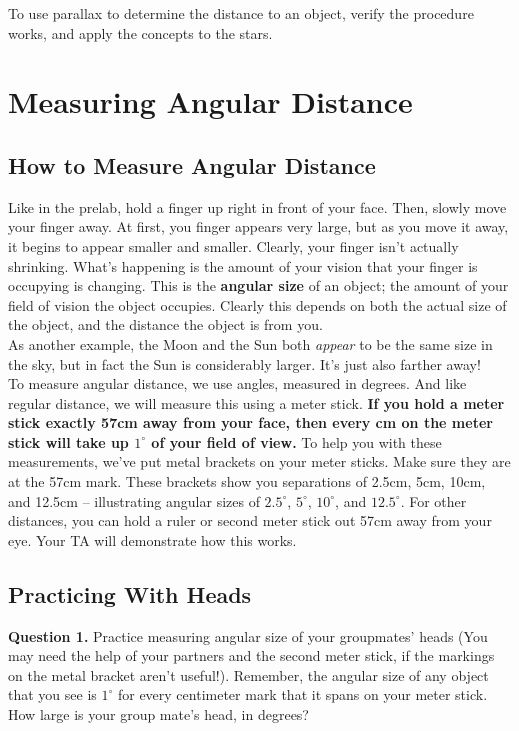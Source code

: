 \documentclass[11pt]{article}
\begin{document}
To use parallax to determine the distance to an object, verify the procedure works, and apply the concepts to the stars.

\newpage

\section{Measuring Angular Distance}

\subsection{How to Measure Angular Distance}
Like in the prelab, hold a finger up right in front of your face. Then, slowly move your finger away. At first, you finger appears very large, but as you move it away, it begins to appear smaller and smaller. Clearly, your finger isn't actually shrinking. What's happening is the amount of your vision that your finger is occupying is changing. This is the \textbf{angular size} of an object; the amount of your field of vision the object occupies. Clearly this depends on both the actual size of the object, and the distance the object is from you.\\

As another example, the Moon and the Sun both \textit{appear} to be the same size in the sky, but in fact the Sun is considerably larger. It's just also farther away!\\

To measure angular distance, we use angles, measured in degrees. And like regular distance, we will measure this using a meter stick. \textbf{If you hold a meter stick exactly 57cm away from your face, then every cm on the meter stick will take up $1^\circ$ of your field of view.} To help you with these measurements, we've put metal brackets on your meter sticks. Make sure they are at the 57cm mark. These brackets show you separations of 2.5cm, 5cm, 10cm, and 12.5cm -- illustrating angular sizes of $2.5^\circ$, $5^\circ$, $10^\circ$, and $12.5^\circ$. For other distances, you can hold a ruler or second meter stick out 57cm away from your eye. Your TA will demonstrate how this works.\\

\subsection{Practicing With Heads}

\textbf{Question 1.} Practice measuring angular size of your groupmates' heads (You may need the help of your partners and the second meter stick, if the markings on the metal bracket aren't useful!).
Remember, the angular size of any object that you see is $1^\circ$ for every centimeter mark that it spans on your meter stick. How large is your group mate's head, in degrees?\\
\end{document}
